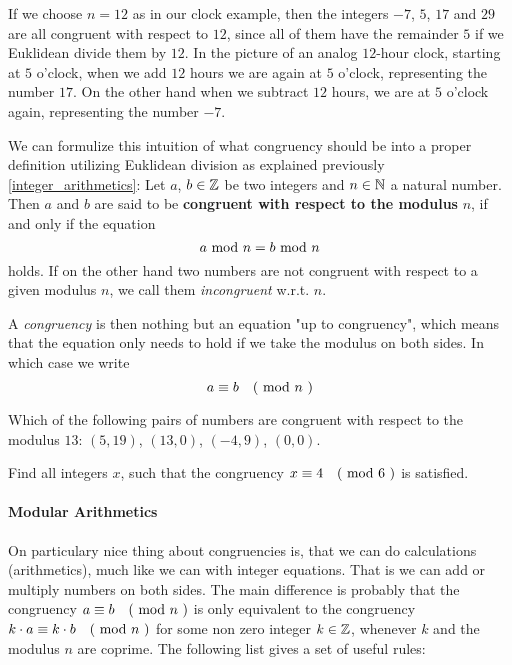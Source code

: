 \begin{example}
If we choose $n=12$ as in our clock example, then the integers $-7$, $5$, $17$ and $29$ are all congruent with respect to $12$, since all of them have the remainder $5$ if we Euklidean divide them by $12$. In the picture of an analog $12$-hour clock, starting at $5$ o'clock, when we add $12$ hours we are again at $5$ o'clock, representing the number $17$. On the other hand when we subtract $12$ hours, we are at $5$ o'clock again, representing the number $-7$. 
\end{example}
We can formulize this intuition of what congruency should be into a proper definition utilizing Euklidean division as explained previously \ref{integer_arithmetics}: Let $ a $, $ b \in \mathbb{Z} $ be two integers and $ n \in \mathbb{N} $ a natural number.
Then $ a $ and $ b $ are said to be \textbf{congruent with respect to the modulus} $ n $, if and only if the equation
\begin{equation}
a \text{ mod } n = b \text{ mod } n
\end{equation}
holds. If on the other hand two numbers are not congruent with respect to a given modulus $n$, we call them \textit{incongruent} w.r.t. $n$. 

A \textit{congruency} is then nothing but an equation "up to congruency", which means that the equation only needs to hold if we take the modulus on both sides. In which case we write 
\begin{equation}
a \equiv b \quad \text{( mod } n \text{ )} 
\end{equation}
\begin{exercise}
Which of the following pairs of numbers are congruent with respect to the modulus $13$: 
$(5,19)$, $(13,0)$, $(-4,9)$, $(0,0)$.
\end{exercise}
\begin{exercise}
Find all integers $x$, such that the congruency $x \equiv 4 \quad \text{( mod } 6 \text{ )}$ is satisfied.
\end{exercise}
\paragraph{Modular Arithmetics}
On particulary nice thing about congruencies is, that we can do calculations (arithmetics), much like we can with integer equations. That is we can add or multiply numbers on both sides. The main difference is probably that the congruency $a \equiv b \quad \text{( mod } n \text{ )}$ is only equivalent to the congruency $k\cdot a \equiv k\cdot b \quad \text{( mod } n \text{ )}$ for some non zero integer $k\in \mathbb{Z}$, whenever $k$ and the modulus $n$ are coprime. The following list gives a set of useful rules:

